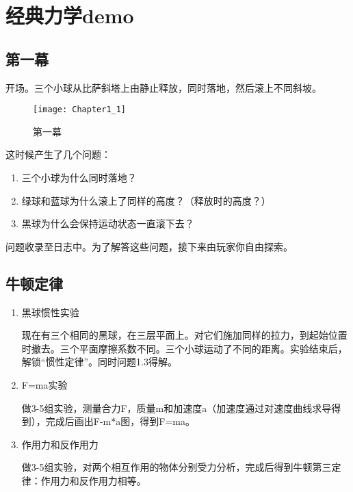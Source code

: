 \documentclass{tstextbook}
\begin{document}
\begin{summary}

\end{summary}

\section{经典力学demo}

\subsection{第一幕}

开场。三个小球从比萨斜塔上由静止释放，同时落地，然后滚上不同斜坡。

\begin{figure}[H]
\centering 
\texttt{[image: Chapter1\_1]} 
\caption{第一幕} 
\label{1.1} 
\end{figure}

这时候产生了几个问题：

\begin{enumerate}
\item{三个小球为什么同时落地？}
\item{绿球和蓝球为什么滚上了同样的高度？（释放时的高度？）}
\item{黑球为什么会保持运动状态一直滚下去？}
\end{enumerate}

问题收录至日志中。为了解答这些问题，接下来由玩家你自由探索。

\subsection{牛顿定律}

\begin{enumerate}

\item{黑球惯性实验}

现在有三个相同的黑球，在三层平面上。对它们施加同样的拉力，到起始位置时撤去。三个平面摩擦系数不同。三个小球运动了不同的距离。实验结束后，解锁“惯性定律”。同时问题1.3得解。

\item{F=ma实验}

做3-5组实验，测量合力F，质量m和加速度a（加速度通过对速度曲线求导得到），完成后画出F-m*a图，得到F=ma。

\item{作用力和反作用力}

做3-5组实验，对两个相互作用的物体分别受力分析，完成后得到牛顿第三定律：作用力和反作用力相等。

\end{enumerate}
\end{document}
